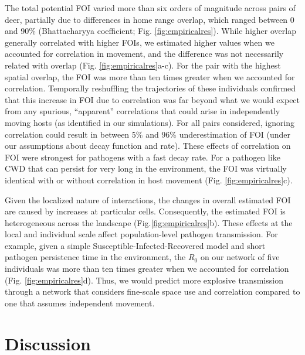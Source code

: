 \documentclass[letterpaper]{article}
\begin{document}
The total potential FOI varied more than six orders of magnitude across pairs of deer, partially due to differences in home range overlap, which ranged between 0 and 90\% (Bhattacharyya coefficient; Fig. \ref{fig:empiricalres}). While higher overlap generally correlated with higher FOIs, we estimated higher values when we accounted for correlation in movement, and the difference was not necessarily related with overlap (Fig. \ref{fig:empiricalres}a-c).  For the pair with the highest spatial overlap, the FOI was more than ten times greater when we accounted for correlation. Temporally reshuffling the trajectories of these individuals  \citet[following ][]{Spiegel2016} confirmed that this increase in FOI due to correlation was far beyond what we would expect from any  spurious, ``apparent'' correlations that could arise in independently moving hosts (as identified in our simulations). For all pairs considered, ignoring correlation could result in between 5\% and 96\% underestimation of FOI (under our assumptions about decay function and rate). These effects of correlation on FOI were strongest for pathogens with a fast decay rate. For a pathogen like CWD that can persist for very long in the environment, the FOI was virtually identical with or without correlation in host movement (Fig. \ref{fig:empiricalres}c). 

Given the localized nature of interactions, the changes in overall estimated FOI are caused by increases at particular cells. Consequently, the estimated FOI is heterogeneous across the landscape (Fig.\ref{fig:empiricalres}b). These effects at the local and individual scale affect population-level pathogen transmission. For example, given a simple Susceptible-Infected-Recovered model and short pathogen persistence time in the environment, the $R_0$ on our network of five individuals was more than ten times greater when we accounted for correlation (Fig. \ref{fig:empiricalres}d). Thus, we would predict more explosive transmission through a network that considers fine-scale space use and correlation compared to one that assumes independent movement.

\section*{Discussion}
\end{document}
